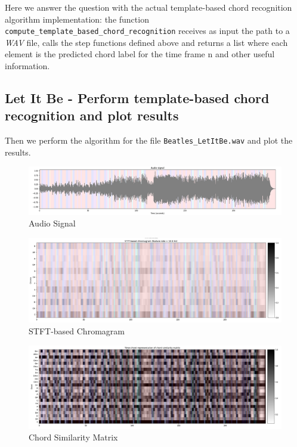 \documentclass[
	12pt, %
]{fphw}
\begin{document}
Here we answer the question with the actual template-based chord recognition algorithm implementation: the function \verb|compute_template_based_chord_recognition| receives as input the path to a \emph{WAV} file, calls the step functions defined above and returns a list where each element is the predicted chord label for the time frame n and other useful information.

\subsection*{Let It Be - Perform template-based chord recognition and plot results}

Then we perform the algorithm for the file \verb|Beatles_LetItBe.wav| and plot the results.

\begin{figure}[H]
 \centering
 \includegraphics[scale=1]{./images/1_audio_signal.png}
 \caption{Audio Signal}
\end{figure}

\begin{figure}[H]
 \centering
 \includegraphics[scale=1]{./images/1_stft_chromagram.png}
 \caption{STFT-based Chromagram}
\end{figure}

\begin{figure}[H]
 \centering
 \includegraphics[scale=1]{./images/1_chord_similarity.png}
 \caption{Chord Similarity Matrix}
\end{figure}
\end{document}
